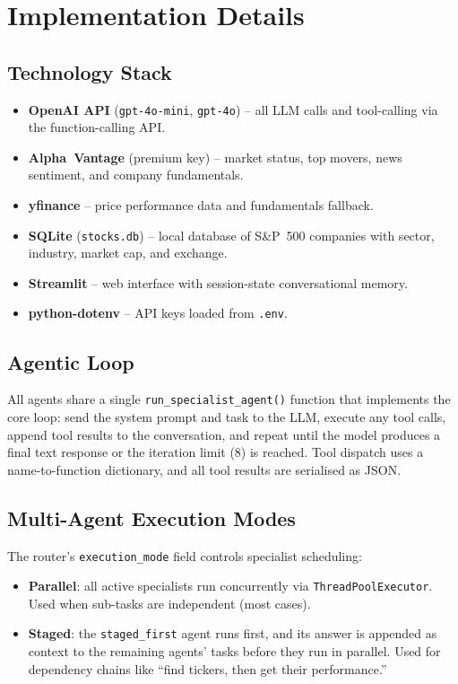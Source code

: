 \documentclass[conference]{IEEEtran}
\begin{document}
\section{Implementation Details}

\subsection{Technology Stack}
\begin{itemize}
  \item \textbf{OpenAI API} (\texttt{gpt-4o-mini}, \texttt{gpt-4o}) -- all LLM calls
        and tool-calling via the function-calling API.
  \item \textbf{Alpha~Vantage} (premium key) -- market status, top movers, news sentiment,
        and company fundamentals.
  \item \textbf{yfinance} -- price performance data and fundamentals fallback.
  \item \textbf{SQLite} (\texttt{stocks.db}) -- local database of S\&P~500 companies
        with sector, industry, market cap, and exchange.
  \item \textbf{Streamlit} -- web interface with session-state conversational memory.
  \item \textbf{python-dotenv} -- API keys loaded from \texttt{.env}.
\end{itemize}

\subsection{Agentic Loop}

All agents share a single \texttt{run\_specialist\_agent()} function that implements
the core loop: send the system prompt and task to the LLM, execute any tool calls,
append tool results to the conversation, and repeat until the model produces a final
text response or the iteration limit (8) is reached.  Tool dispatch uses a name-to-function
dictionary, and all tool results are serialised as JSON.

\subsection{Multi-Agent Execution Modes}

The router's \texttt{execution\_mode} field controls specialist scheduling:
\begin{itemize}
  \item \textbf{Parallel}: all active specialists run concurrently via
        \texttt{ThreadPoolExecutor}.  Used when sub-tasks are independent (most cases).
  \item \textbf{Staged}: the \texttt{staged\_first} agent runs first, and its answer
        is appended as context to the remaining agents' tasks before they run in parallel.
        Used for dependency chains like ``find tickers, then get their performance.''
\end{itemize}
\end{document}
